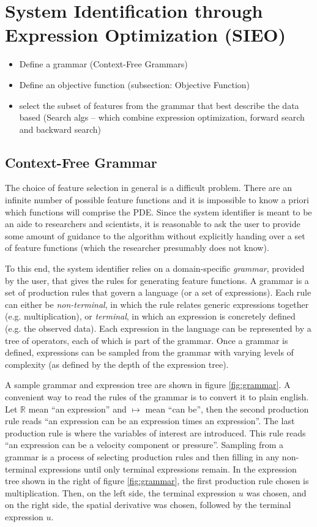\documentclass{article}
\begin{document}
\section{System Identification through Expression Optimization (SIEO)}
\begin{itemize}
    \item Define a grammar (Context-Free Grammars)
    \item Define an objective function (subsection: Objective Function)
    \item select the subset of features from the grammar that best describe the data based (Search algs -- which combine expression optimization, forward search and backward search)
\end{itemize}

\subsection{Context-Free Grammar}

The choice of feature selection in general is a difficult problem. There are an infinite number of possible feature functions and it is impossible to know a priori which functions will comprise the PDE. Since the system identifier is meant to be an aide to researchers and scientists, it is reasonable to ask the user to provide some amount of guidance to the algorithm without explicitly handing over a set of feature functions (which the researcher presumably does not know).

To this end, the system identifier relies on a domain-specific \textit{grammar}, provided by the user, that gives the rules for generating feature functions. A grammar is a set of production rules that govern a language (or a set of expressions). Each rule can either be \textit{non-terminal}, in which the rule relates generic expressions together (e.g. multiplication), or \textit{terminal}, in which an expression is concretely defined (e.g. the observed data). Each expression in the language can be represented by a tree of operators, each of which is part of the grammar. Once a grammar is defined, expressions can be sampled from the grammar with varying levels of complexity (as defined by the depth of the expression tree).

A sample grammar and expression tree are shown in figure \ref{fig:grammar}. A convenient way to read the rules of the grammar is to convert it to plain english. Let $\mathbb{R}$ mean ``an expression'' and $\mapsto$ mean ``can be'', then the second production rule reads ``an expression can be an expression times an expression''. The last production rule is where the variables of interest are introduced. This rule reads ``an expression can be a velocity component or pressure''. Sampling from a grammar is a process of selecting production rules and then filling in any non-terminal expressions until only terminal expressions remain. In the expression tree shown in the right of figure \ref{fig:grammar}, the first production rule chosen is multiplication. Then, on the left side, the terminal expression $u$ was chosen, and on the right side, the spatial derivative was chosen, followed by the terminal expression $u$.
\end{document}
